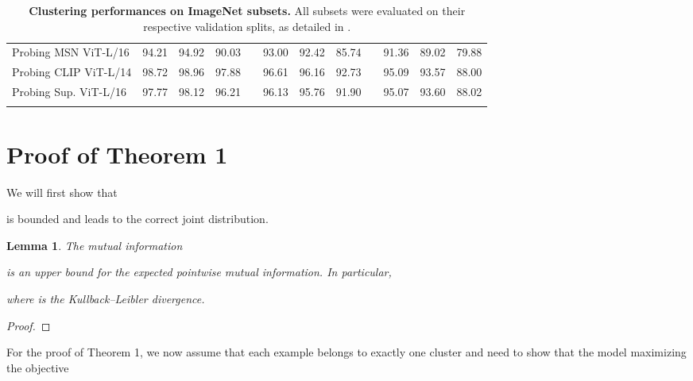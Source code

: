 \documentclass{bmvc2k}
\newtheorem{lemma}{Lemma}
\begin{document}
\begin{table*}
\begin{adjustbox}{width=0.95\columnwidth,center}
\begin{tabular}{ l c c c c c c c c c c c }
  
  \multicolumn{1}{l}{Probing MSN ViT-L/16} & 94.21 & 94.92 & 90.03 &     & 93.00 & 92.42 & 85.74 &      & 91.36 & 89.02 & 79.88 \\
 
 \multicolumn{1}{l}{Probing CLIP ViT-L/14} 
   & 98.72 & 98.96 & 97.88 &     & 96.61 & 
96.16 & 92.73 &      & 95.09 & 93.57 & 88.00 \\

 
 \multicolumn{1}{l}{Probing Sup. ViT-L/16 }  & 97.77 & 98.12 & 96.21 &     & 96.13 & 95.76 & 91.90 &      & 95.07 & 93.60 & 88.02 \\
			\bottomrule
   \vspace{0.5cm}
   \end{tabular}
	\end{adjustbox}	
  \caption{\textbf{Clustering performances on ImageNet subsets.} All subsets were evaluated on their respective validation splits, as detailed in .}
    \label{tabel:imagenet-subsets}
\end{table*}

 


\clearpage
\section{Proof of Theorem 1}
\label{proofs}


We will first show that 


is bounded and leads to the correct joint distribution.

\begin{lemma}
\label{lemma:expected_pmi}
The mutual information

is an upper bound for the expected pointwise mutual information. In particular,

where  is the Kullback--Leibler divergence.  
\end{lemma}

\begin{proof}

\end{proof}

For the proof of Theorem 1, we now assume that each example  belongs to exactly one cluster  and need to show that the model  maximizing the objective
\end{document}
